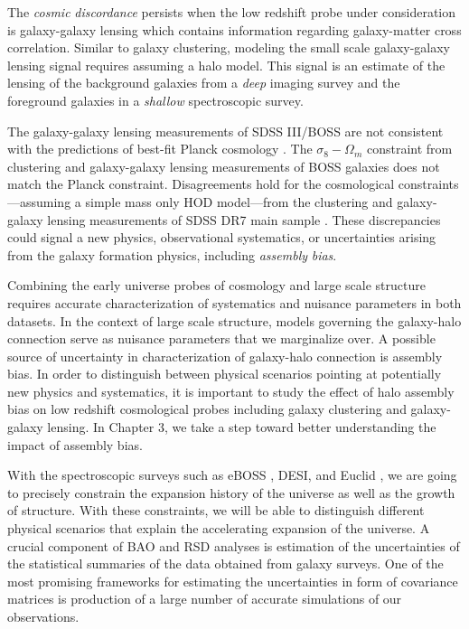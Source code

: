 The \emph{cosmic} \emph{discordance} persists when the low redshift probe under consideration is galaxy-galaxy lensing which contains information regarding galaxy-matter cross correlation. Similar to galaxy clustering, modeling the small scale galaxy-galaxy lensing signal requires assuming a halo model. 
This signal is an estimate of the lensing of the background galaxies from a \emph{deep} imaging survey and the foreground galaxies in a \emph{shallow} spectroscopic survey.

The galaxy-galaxy lensing measurements of SDSS III/BOSS \citep{miyatake15,lensingislow} are not consistent with the predictions of best-fit Planck cosmology \citep{planckII}.
The $\sigma_{8}-\Omega_{m}$ constraint from clustering and galaxy-galaxy lensing measurements of BOSS galaxies \citep{more15} does not match the Planck constraint.
Disagreements hold for the cosmological constraints---assuming a simple mass only HOD model---from the clustering and galaxy-galaxy lensing measurements of SDSS DR7 main sample \citep{cacciato13}. These discrepancies could signal a new physics, observational systematics, or uncertainties arising from the galaxy formation physics, including \emph{assembly} \emph{bias}.

Combining the early universe probes of cosmology and large scale structure requires accurate characterization of systematics and nuisance parameters in both datasets.
In the context of large scale structure, models governing the galaxy-halo connection serve as nuisance parameters that we marginalize over. A possible source of uncertainty in characterization of galaxy-halo connection is assembly bias. In order to distinguish between physical scenarios pointing at potentially new physics and systematics, it is important to study the effect of halo assembly bias on low redshift cosmological probes including galaxy clustering and galaxy-galaxy lensing. In Chapter 3, we take a step toward better understanding the impact of assembly bias. 

With the spectroscopic surveys such as eBOSS \citep{eboss}, DESI, and Euclid \citep{euclid}, 
we are going to precisely constrain the expansion history of the universe as well as the growth of structure. 
With these constraints, we will be able to distinguish different physical scenarios that explain the accelerating expansion of the universe. 
A crucial component of BAO and RSD analyses is estimation of the uncertainties of the statistical summaries of 
the data obtained from galaxy surveys. One of the most promising frameworks for estimating the uncertainties in form of covariance matrices is production 
of a large number of accurate simulations of our observations. 

